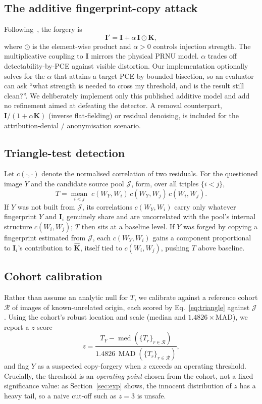 \documentclass[11pt]{article}
\newcommand{\K}{\mathbf{K}}
\newcommand{\I}{\mathbf{I}}
\begin{document}
\subsection{The additive fingerprint-copy attack}
Following~\cite{goljan2011}, the forgery is
\begin{equation}
  \I' = \I + \alpha \, \I \odot \K,
  \label{eq:inject}
\end{equation}
where $\odot$ is the element-wise product and $\alpha>0$ controls injection
strength. The multiplicative coupling to $\I$ mirrors the physical PRNU model.
$\alpha$ trades off detectability-by-PCE against visible distortion. Our
implementation optionally solves for the $\alpha$ that attains a target PCE by
bounded bisection, so an evaluator can ask ``what strength is needed to cross my
threshold, and is the result still clean?''. We deliberately implement only this
published additive model and add no refinement aimed at defeating the detector.
A removal counterpart, $\I/(1+\alpha\K)$ (inverse flat-fielding) or residual
denoising, is included for the attribution-denial / anonymisation scenario.

\subsection{Triangle-test detection}
Let $c(\cdot,\cdot)$ denote the normalised correlation of two residuals. For the
questioned image $Y$ and the candidate source pool $\mathcal{J}$, form, over all
triples $\{i<j\}$,
\begin{equation}
  T = \operatorname*{mean}_{i<j}\; c(W_Y,W_i)\,c(W_Y,W_j)\,c(W_i,W_j).
  \label{eq:triangle}
\end{equation}
If $Y$ was not built from $\mathcal{J}$, its correlations $c(W_Y,W_i)$ carry only
whatever fingerprint $Y$ and $\I_i$ genuinely share and are uncorrelated with the
pool's internal structure $c(W_i,W_j)$; $T$ then sits at a baseline level. If $Y$
was forged by copying a fingerprint estimated from $\mathcal{J}$, each
$c(W_Y,W_i)$ gains a component proportional to $\I_i$'s contribution to
$\hat{\K}$, itself tied to $c(W_i,W_j)$, pushing $T$ above baseline.

\subsection{Cohort calibration}
Rather than assume an analytic null for $T$, we calibrate against a reference
cohort $\mathcal{R}$ of images of known-unrelated origin, each scored by
Eq.~\eqref{eq:triangle} against $\mathcal{J}$. Using the cohort's robust location
and scale (median and $1.4826\times$MAD), we report a $z$-score
\begin{equation}
  z = \frac{T_Y - \operatorname{med}(\{T_r\}_{r\in\mathcal{R}})}
           {1.4826\,\operatorname{MAD}(\{T_r\}_{r\in\mathcal{R}})},
\end{equation}
and flag $Y$ as a suspected copy-forgery when $z$ exceeds an operating threshold.
Crucially, the threshold is an \emph{operating point} chosen from the cohort, not
a fixed significance value: as Section~\ref{sec:exp} shows, the innocent
distribution of $z$ has a heavy tail, so a naive cut-off such as $z=3$ is unsafe.
\end{document}
